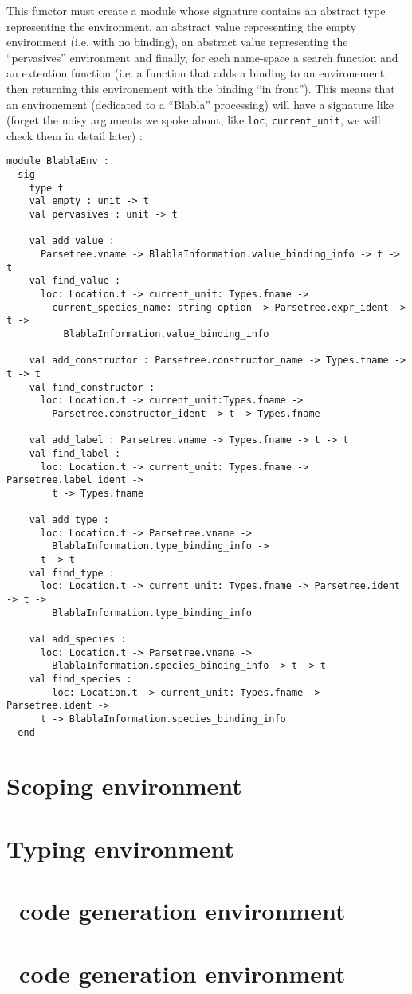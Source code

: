 \medskip
This functor must create a module whose signature contains an abstract
type representing the environment, an abstract value representing the
empty environment (i.e. with no binding), an abstract value
representing the ``pervasives'' environment and finally, for each
name-space a search function and an extention function (i.e. a
function that adds a binding to an environement, then returning this
environement with the binding ``in front''). This means that an
environement (dedicated to a ``Blabla'' processing) will have a
signature like (forget the noisy arguments we spoke about, like
{\tt loc}, {\tt current\_unit}, we will check them in detail later) :
{\scriptsize
\begin{lstlisting}[language=MyOCaml]
module BlablaEnv :
  sig
    type t
    val empty : unit -> t
    val pervasives : unit -> t

    val add_value :
      Parsetree.vname -> BlablaInformation.value_binding_info -> t -> t
    val find_value :
      loc: Location.t -> current_unit: Types.fname ->
        current_species_name: string option -> Parsetree.expr_ident -> t ->
          BlablaInformation.value_binding_info

    val add_constructor : Parsetree.constructor_name -> Types.fname -> t -> t
    val find_constructor :
      loc: Location.t -> current_unit:Types.fname ->
        Parsetree.constructor_ident -> t -> Types.fname

    val add_label : Parsetree.vname -> Types.fname -> t -> t
    val find_label :
      loc: Location.t -> current_unit: Types.fname -> Parsetree.label_ident ->
        t -> Types.fname

    val add_type :
      loc: Location.t -> Parsetree.vname ->
        BlablaInformation.type_binding_info ->
      t -> t
    val find_type :
      loc: Location.t -> current_unit: Types.fname -> Parsetree.ident -> t ->
        BlablaInformation.type_binding_info

    val add_species :
      loc: Location.t -> Parsetree.vname ->
        BlablaInformation.species_binding_info -> t -> t
    val find_species :
        loc: Location.t -> current_unit: Types.fname -> Parsetree.ident ->
      t -> BlablaInformation.species_binding_info
  end
\end{lstlisting}
}


\section{Scoping environment}

\section{Typing environment}

\section{\ocaml\ code generation environment}

\section{\coq\ code generation environment}
